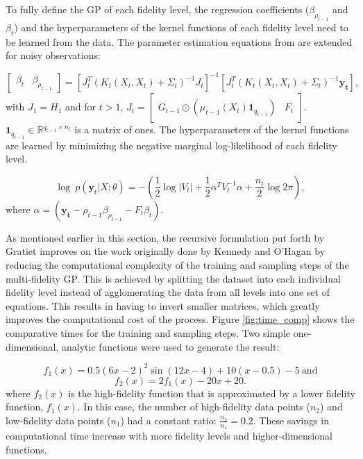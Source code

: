 To fully define the GP of each fidelity level, the regression coefficients ($\beta_{\rho_{t-1}}$ and $\beta_t$) and the hyperparameters of the kernel functions of each fidelity level need to be learned from the data. The parameter estimation equations from  \cite{gratiet_multi-fidelity_nodate} are extended for noisy observations:

\begin{equation}
    \begin{bmatrix}
    \beta_t & \beta_{\rho_{t-1}}
    \end{bmatrix} = \left [ J_t^T \left ( K_t(X_t,X_t) + \Sigma_t \right )^{-1} J_t \right ]^{-1} \left [ J_t^T \left ( K_t(X_t,X_t) + \Sigma_t \right ) ^{-1} \mathbf{y_t} \right ], 
\end{equation}
with $J_1 = H_1$ and for $t > 1$, $J_t =  \begin{bmatrix} G_{t-1} \odot \left ( \mu_{t-1} \left ( X_t \right )  \mathbf{1}_{q_{t-1}} \right ) & F_t \end{bmatrix}$. $\mathbf{1}_{q_{t-1}} \in \mathbb{R} ^{q_{t-1} \times n_t} $ is a matrix of ones. The hyperparameters of the kernel functions are learned by minimizing the negative marginal log-likelihood of each fidelity level.

\begin{equation}
    \log~p(\mathbf{y}_t|X;\theta) = -\left (\frac{1}{2} \log|V_t| + \frac{1}{2} \alpha^T V_t^{-1} \alpha + \frac{n_t}{2}\log 2\pi \right),
\end{equation}
where $\alpha = \left (\mathbf{y_t} - \rho_{t-1} \beta_{\rho_{t-1}}-F_t\beta_t \right )$.

As mentioned earlier in this section, the recursive formulation put forth by Gratiet \cite{le_gratiet_recursive_2014} improves on the work originally done by Kennedy and O'Hagan \cite{kennedy_predicting_2000} by reducing the computational complexity of the training and sampling steps of the multi-fidelity GP. This is achieved by splitting the dataset into each individual fidelity level instead of agglomerating the data from all levels into one set of equations. This results in having to invert smaller matrices, which greatly improves the computational cost of the process. Figure \ref{fig:time_comp} shows the comparative times for the training and sampling steps. Two simple one-dimensional, analytic functions were used to generate the result: 

\begin{equation}
    f_1(x) = 0.5 \left ( 6x - 2\right )^2 \sin{ \left (12x -4 \right )} + 10 \left ( x - 0.5 \right ) -5 ~\text{and}
\end{equation}
\begin{equation}
        f_2(x) = 2f_1(x) - 20x + 20.
\end{equation}
where $f_2(x)$ is the high-fidelity function that is approximated by a lower fidelity function, $f_1(x)$.
In this case, the number of high-fidelity data points ($n_2$) and low-fidelity data points ($n_1$) had a constant ratio: $\frac{n_2}{n_1} = 0.2$. These savings in computational time increase with more fidelity levels and higher-dimensional functions. 

